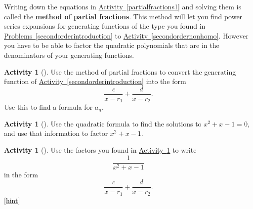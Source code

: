 \documentclass[10pt,]{book}
\newcommand{\terminology}[1]{\textbf{#1}}
\theoremstyle{plain}
\theoremstyle{definition}
\theoremstyle{definition}
\theoremstyle{definition}
\newtheorem{activity}[project]{Activity}
\numberwithin{equation}{chapter}
\begin{document}
\hypertarget{p-1362}{}%
Writing down the equations in \hyperref[partialfractions1]{Activity~\ref{partialfractions1}} and solving them is called the \terminology{method of partial fractions}. This method will let you find power series expansions for generating functions of the type you found in \hyperref[secondorderintroduction]{Problems~\ref{secondorderintroduction}} to \hyperref[secondordernonhomo]{Activity~\ref{secondordernonhomo}}. However you have to be able to factor the quadratic polynomials that are in the denominators of your generating functions.%
\begin{activity}[]\label{activity-259}
\hypertarget{p-1363}{}%
Use the method of partial fractions to convert the generating function of \hyperref[secondorderintroduction]{Activity~\ref{secondorderintroduction}} into the form%
\begin{equation*}
\frac{c}{x-r_1} + \frac{d}{x-r_2}\text{.}
\end{equation*}
Use this to find a formula for \(a_n\).%
\end{activity}
\begin{activity}[]\label{factorFibonacci}
\hypertarget{p-1365}{}%
Use the quadratic formula to find the solutions to \(x^2+x-1=0\), and use that information to factor \(x^2+x-1\).%
\end{activity}
\begin{activity}[]\label{fractionFibonacci}
\hypertarget{p-1367}{}%
Use the factors you found in \hyperref[factorFibonacci]{Activity~\ref{factorFibonacci}} to write%
\begin{equation*}
\frac{1}{x^2+x-1}
\end{equation*}
in the form%
\begin{equation*}
\frac{c}{x-r_1} + \frac{d}{x-r_2}.
\end{equation*}
%
\hfill{\tiny\hyperlink{a-268}{[hint]}\hypertarget{q-268}{}}\end{activity}
\end{document}
